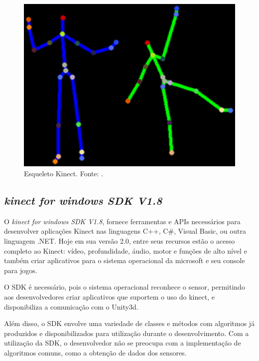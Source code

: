     \begin{figure}[H]
    \centering
    \includegraphics [keepaspectratio=true,scale=0.60]{figuras/esqueletoKinect.eps}
    \caption{Esqueleto Kinect. Fonte: \cite{microsoftResearch}.}

    \label{esqueletokinect}
    \end{figure}

    \subsection{\textit{kinect for windows SDK V1.8 }}\label{sub:sdk}
      O \textit{kinect for windows SDK V1.8}, fornece ferramentas e APIs necessários para desenvolver
    aplicações Kinect nas linguagens  C++, C\#, Visual Basic, ou outra linguagem .NET. Hoje em sua versão 2.0,
    entre seus recursos estão o acesso completo ao Kinect: vídeo,
    profundidade, áudio, motor e funções de alto nível e também  criar aplicativos
    para o sistema operacional da microsoft e seu console para jogos.

     O SDK é necessário, pois o sistema operacional reconhece o sensor, permitindo aos
     desenvolvedores criar aplicativos que suportem o uso do kinect, e disponibiliza a comunicação com o Unity3d.

      Além disso, o SDK envolve uma variedade
    de classes e métodos com algoritmos já produzidos e disponibilizados para utilização
    durante o desenvolvimento. Com a utilização da SDK, o desenvolvedor não se preocupa
    com a implementação de algoritmos comuns, como a obtenção de dados dos
    sensores.


